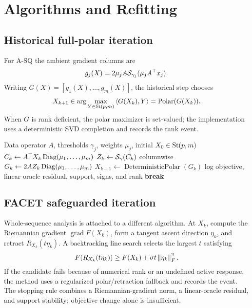 \section{Algorithms and Refitting}
\label{sec:method}



\subsection{Historical full-polar iteration}
For A-SQ the ambient gradient columns are
\[
g_j(X)=2\mu_j A\mathcal{S}_{\gamma_j}(\mu_jA^\top x_j).
\]
Writing \(G(X)=[g_1(X),\ldots,g_m(X)]\), the historical step chooses
\[
X_{k+1}\in\arg\max_{Y\in\mathrm{St}(p,m)}\left\langle G(X_k),Y\right\rangle=\operatorname{Polar}(G(X_k)).
\]
When \(G\) is rank deficient, the polar maximizer is set-valued; the implementation uses a deterministic SVD completion and records the rank event.

\begin{algorithm}[t]
\caption{Historical full-polar A-SQ iteration}
\label{alg:full-polar}
\begin{algorithmic}[1]
\Require Data operator \(A\), thresholds \(\gamma_j\), weights \(\mu_j\), initial \(X_0\in\mathrm{St}(p,m)\)
  \State \(C_k\gets A^\top X_k\operatorname{Diag}(\mu_1,\ldots,\mu_m)\)
  \State \(Z_k\gets \mathcal{S}_{\gamma}(C_k)\) columnwise
  \State \(G_k\gets 2A Z_k\operatorname{Diag}(\mu_1,\ldots,\mu_m)\)
  \State \(X_{k+1}\gets\operatorname{DeterministicPolar}(G_k)\)
  \State log objective, linear-oracle residual, support, signs, and rank
   \State \textbf{break} \EndIf
\EndFor
\end{algorithmic}
\end{algorithm}

\subsection{FACET safeguarded iteration}
Whole-sequence analysis is attached to a different algorithm. At \(X_k\), compute the Riemannian gradient \(\operatorname{grad}F(X_k)\), form a tangent ascent direction \(\eta_k\), and retract \(R_{X_k}(t\eta_k)\). A backtracking line search selects the largest \(t\) satisfying
\[
F(R_{X_k}(t\eta_k))\ge F(X_k)+\sigma t\left\lVert \eta_k \right\rVert_F^2.
\]
If the candidate fails because of numerical rank or an undefined active response, the method uses a regularized polar/retraction fallback and records the event. The stopping rule combines a Riemannian-gradient norm, a linear-oracle residual, and support stability; objective change alone is insufficient.

